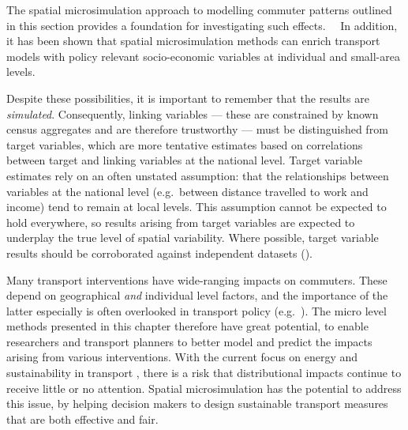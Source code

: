 The spatial microsimulation approach to modelling commuter
patterns outlined in this section provides a foundation for investigating such
effects. 　In addition, it has been shown that spatial microsimulation methods
can enrich transport models with policy relevant socio-economic variables at
individual and small-area levels.

Despite these possibilities, it is important to remember that the results are
\emph{simulated}. Consequently, 
linking variables --- these
are constrained by known census aggregates and are therefore trustworthy ---
must be distinguished from target variables, which are more tentative
estimates based on correlations between target and linking
variables at the national level. Target variable
estimates rely on an often unstated assumption: that the relationships
between variables at the national level (e.g.~between distance travelled to
work and income) tend to remain at local levels. This assumption cannot be
expected to hold everywhere, so results arising from target variables are
expected to underplay the true level of spatial variability. Where possible,
target variable results should be corroborated against independent datasets
(\citealp{Edwards2009}).

Many transport interventions have wide-ranging impacts on commuters.
These depend on geographical \emph{and} individual level factors,
and the importance of the latter especially is often overlooked in transport policy
 (e.g.~\citealp{Tribby2012}).
The micro level methods presented in this chapter therefore have great potential,
to enable researchers and transport planners to better model and predict the
impacts arising from various interventions.
With the current focus on energy and sustainability in transport
\citep{Chapman2007}, there is a risk that distributional impacts continue
to receive little or no attention. Spatial microsimulation
has the potential to address this issue, by helping
decision makers to design sustainable transport measures
that are both effective and fair.
